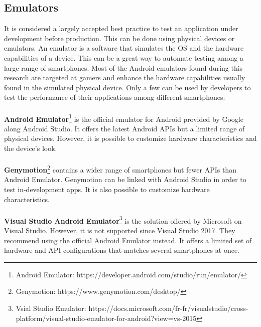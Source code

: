\documentclass{kththesis}
\begin{document}
\subsection{Emulators}
    It is considered a largely accepted best practice to test an application under development before production. This can be done using physical devices or emulators. An emulator is a software that simulates the OS and the hardware capabilities of a device\cite{emulator_def}. This can be a great way to automate testing among a large range of smartphones. Most of the Android emulators found during this research are targeted at gamers and enhance the hardware capabilities usually found in the simulated physical device. Only a few can be used by developers to test the performance of their applications among different smartphones:
    
\paragraph{}
\textbf{Android Emulator}\footnote{Android Emulator: https://developer.android.com/studio/run/emulator/} is the official emulator for Android provided by Google along Android Studio. It offers the latest Android APIs but a limited range of physical devices. However, it is possible to customize hardware characteristics and the device's look.

\paragraph{}
\textbf{Genymotion}\footnote{Genymotion: https://www.genymotion.com/desktop/} contains a wider range of smartphones but fewer APIs than Android Emulator. Genymotion can be linked with Android Studio in order to test in-development apps. It is also possible to customize hardware characteristics.

\paragraph{}
\textbf{Visual Studio Android Emulator}\footnote{Vsial Studio Emulator: https://docs.microsoft.com/fr-fr/visualstudio/cross-platform/visual-studio-emulator-for-android?view=vs-2015} is the solution offered by Microsoft on Visual Studio. However, it is not supported since Visual Studio 2017. They recommend using the official Android Emulator instead. It offers a limited set of hardware and API configurations that matches several smartphones at once. 
\end{document}
